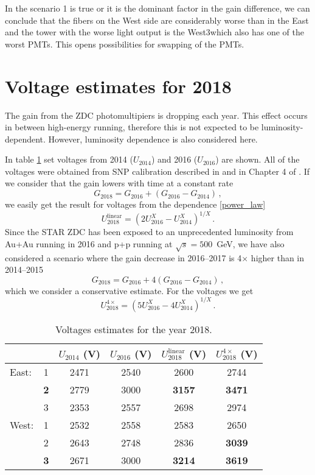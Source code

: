 \documentclass[a4paper,10pt]{article}
\begin{document}
In the scenario 1 is true or it is the dominant factor in the gain difference, we can conclude that the fibers on the West side are considerably worse than in the East and the tower with the worse light output is the West3\@ which also has one of the worst PMTs. This opens possibilities for swapping of the PMTs.

\section{Voltage estimates for 2018}
The gain from the ZDC photomultipiers is dropping each year. This effect occurs in between high-energy running, therefore this is not expected to be luminosity-dependent. However, luminosity dependence is also considered here.

In table \ref{voltsTable} set voltages from 2014 ($U_{2014}$) and 2016 ($U_{2016}$) are shown. All of the voltages were obtained from SNP calibration described in \cite{calib2014} and in Chapter 4 of \cite{ZDC_ops_manual}\@. If we consider that the gain lowers with time at a constant rate
\begin{equation}
G_{2018} = G_{2016} + (G_{2016} - G_{2014})\,,
\end{equation}
we easily get the result for voltages from the dependence \eqref{power_law}
\begin{equation}
U_{2018}^\text{linear} = (2 U_{2016}^X - U_{2014}^X)^{1/X}\,.
\end{equation}
Since the STAR ZDC has been exposed to an unprecedented luminosity from Au+Au running in 2016 and p+p running at $\sqrt{s} = 500$~GeV, we have also considered a scenario where the gain decrease in 2016--2017 is 4$\times$ higher than in 2014--2015
\begin{equation}
G_{2018} = G_{2016} + 4(G_{2016} - G_{2014})\,,
\end{equation}
which we consider a conservative estimate. For the voltages we get
\begin{equation}
U_{2018}^{4\times} = (5 U_{2016}^X - 4 U_{2014}^X)^{1/X}\,.
\end{equation}

\begin{table}[htb]
\caption{\label{voltsTable}Voltages estimates for the year 2018.}
\begin{center}
\begin{tabular}{lccccc}
\toprule
&&$U_{2014}$ (V)&$U_{2016}$ (V)& $U_{2018}^\text{linear}$ (V)&$U_{2018}^{4\times}$ (V)\\
\midrule
East:&1&2471&2540&2600&2744\\
&\textbf{2}&2779&3000&\textbf{3157}&\textbf{3471}\\
&3&2353&2557&2698&2974\\
\midrule
West:&1&2532&2558&2583&2650\\
&2&2643&2748&2836&\textbf{3039}\\
&\textbf{3}&2671&3000&\textbf{3214}&\textbf{3619}\\
\bottomrule
\end{tabular}
\end{center}
\end{table}
\end{document}
